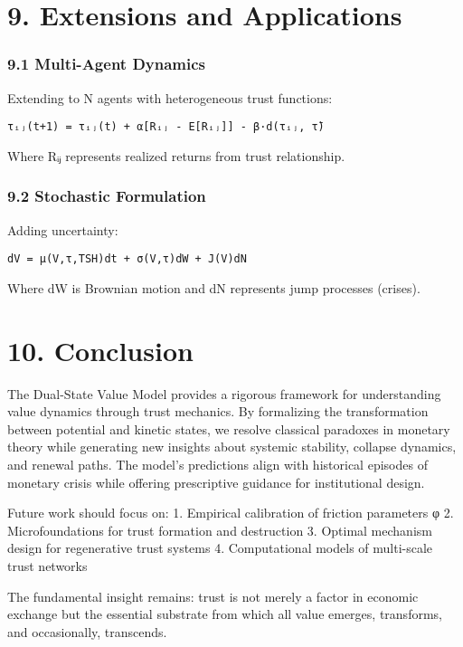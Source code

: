 \documentclass[11pt,oneside]{book}
\begin{document}
\section{9. Extensions and Applications}

\subsubsection{9.1 Multi-Agent Dynamics}

Extending to N agents with heterogeneous trust functions:

\begin{verbatim}
τᵢⱼ(t+1) = τᵢⱼ(t) + α[Rᵢⱼ - E[Rᵢⱼ]] - β·d(τᵢⱼ, τ̄)
\end{verbatim}

Where Rᵢⱼ represents realized returns from trust relationship.

\subsubsection{9.2 Stochastic Formulation}

Adding uncertainty:

\begin{verbatim}
dV = μ(V,τ,TSH)dt + σ(V,τ)dW + J(V)dN
\end{verbatim}

Where dW is Brownian motion and dN represents jump processes (crises).

\section{10. Conclusion}

The Dual-State Value Model provides a rigorous framework for understanding value dynamics through trust mechanics. By formalizing the transformation between potential and kinetic states, we resolve classical paradoxes in monetary theory while generating new insights about systemic stability, collapse dynamics, and renewal paths. The model's predictions align with historical episodes of monetary crisis while offering prescriptive guidance for institutional design.

Future work should focus on:
1. Empirical calibration of friction parameters φ
2. Microfoundations for trust formation and destruction
3. Optimal mechanism design for regenerative trust systems
4. Computational models of multi-scale trust networks

The fundamental insight remains: trust is not merely a factor in economic exchange but the essential substrate from which all value emerges, transforms, and occasionally, transcends.




\end{document}

